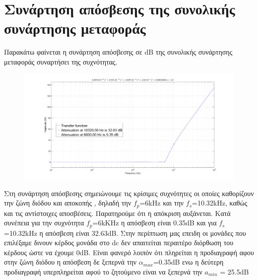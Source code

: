 \documentclass{article}
\begin{document}
{\section*{Συνάρτηση απόσβεσης της συνολικής συνάρτησης μεταφοράς} 
Παρακάτω φαίνεται η συνάρτηση απόσβεσης σε dB της συνολικής συνάρτησης μεταφοράς συναρτήσει της συχνότητας. 
\begin{figure}[h!]
\centering
 	\advance\leftskip-3cm
  \includegraphics[width=180mm,scale=2]{aposvesi.png}
\end{figure}  \color{white}{
Στη συνάρτηση} \color{black} Στη συνάρτηση  απόσβεσης σημειώνουμε τις κρίσιμες συχνότητες οι οποίες καθορίζουν την ζώνη διόδου και αποκοπής , δηλαδή την $f_p$=6kHz και την $f_s$=10.32kHz, καθώς και τις αντίστοιχες αποσβέσεις. Παρατηρούμε ότι η απόκριση αυξάνεται.
Κατά συνέπεια για την συχνότητα $f_p$=6kΚHz η απόσβεση είναι 0.35dB και για $f_s$=10.32kHz η απόσβεση είναι 32.63dB. Στην περίπτωση μας επειδη οι μονάδες που επιλέξαμε δινουν κέρδος μονάδα στο dc δεν απαιτείται περαιτέρο διόρθωση του κέρδους ώστε να έχουμε 0dB. Είναι φανερό  λοιπόν ότι πληρείται η προδιαγραφή αφου στην ζώνη διόδου η απόσβεση δε ξεπερνά την $α_{max}$=0.35dB ενω η δεύτερη προδιαγραφή υπερπληρείται αφού το ζητούμενο είναι να ξεπερνά την $a_{min}$ = 25.5dB\\

\clearpage
}
\end{document}

